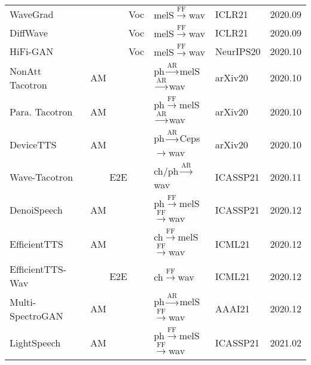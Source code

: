 \documentclass{article}
\begin{document}
\begin{center}
\begin{longtable}{l | l | l | l | l }
		WaveGrad~\cite{chen2020wavegrad}               & ~~~~~~~~Voc      & {\color{red}melS}$\stackrel{\text{FF}}{\longrightarrow}$wav          & ICLR21& 2020.09         \\
		DiffWave~\cite{kong2020diffwave}               & ~~~~~~~~Voc      & {\color{red}melS}$\stackrel{\text{FF}}{\longrightarrow}$wav          & ICLR21& 2020.09         \\
		HiFi-GAN~\cite{kong2020hifi}               & ~~~~~~~~Voc      & {\color{red}melS}$\stackrel{\text{FF}}{\longrightarrow}$wav   & NeurIPS20 & 2020.10         \\
		NonAtt Tacotron~\cite{shen2020non} & AM       & {\color{blue}ph}$\stackrel{\text{AR}}{\longrightarrow}${\color{red}melS}$\stackrel{\text{AR}}{\longrightarrow}$wav              &arXiv20& 2020.10       \\
		Para. Tacotron~\cite{elias2020parallel}      & AM       & {\color{blue}ph}$\stackrel{\text{FF}}{\longrightarrow}${\color{red}melS}$\stackrel{\text{AR}}{\longrightarrow}$wav              &arXiv20& 2020.10     \\
		DeviceTTS~\cite{huang2020devicetts}              & AM       &  {\color{blue}ph}$\stackrel{\text{AR}}{\longrightarrow}${\color{red}Ceps}$\rightarrow$wav              &arXiv20& 2020.10  \\
		Wave-Tacotron~\cite{weiss2020wave}          & ~~~~E2E & {\color{blue}ch/ph}$\stackrel{\text{AR}}{\longrightarrow}$wav  &ICASSP21& 2020.11    \\
		DenoiSpeech~\cite{zhang2020denoising}            & AM       &{\color{blue}ph}$\stackrel{\text{FF}}{\longrightarrow}${\color{red}melS}$\stackrel{\text{FF}}{\longrightarrow}$wav     & ICASSP21 & 2020.12        \\
		EfficientTTS~\cite{miao2020efficienttts}            & AM       &{\color{blue}ch}$\stackrel{\text{FF}}{\longrightarrow}${\color{red}melS}$\stackrel{\text{FF}}{\longrightarrow}$wav     & ICML21 & 2020.12        \\
		EfficientTTS-Wav~\cite{miao2020efficienttts}             & ~~~~E2E       &{\color{blue}ch}$\stackrel{\text{FF}}{\longrightarrow}$wav     & ICML21 & 2020.12        \\
		Multi-SpectroGAN~\cite{lee2020multi} & AM       &{\color{blue}ph}$\stackrel{\text{AR}}{\longrightarrow}${\color{red}melS} $\stackrel{\text{FF}}{\longrightarrow}$wav     & AAAI21 & 2020.12        \\
		LightSpeech~\cite{luo2021lightspeech}            & AM       &{\color{blue}ph}$\stackrel{\text{FF}}{\longrightarrow}${\color{red}melS}$\stackrel{\text{FF}}{\longrightarrow}$wav     & ICASSP21 & 2021.02        \\

\end{longtable}
\end{center}
\end{document}
